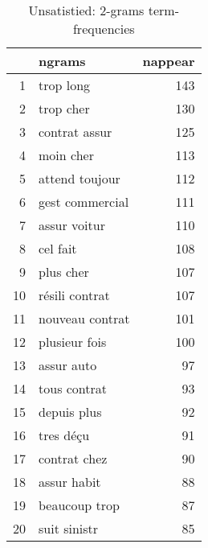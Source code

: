 \begin{table}[ht]
\centering
\begin{tabular}{rlr}
  \hline
 & ngrams & nappear \\ 
  \hline
1 & trop long & 143 \\ 
  2 & trop cher & 130 \\ 
  3 & contrat assur & 125 \\ 
  4 & moin cher & 113 \\ 
  5 & attend toujour & 112 \\ 
  6 & gest commercial & 111 \\ 
  7 & assur voitur & 110 \\ 
  8 & cel fait & 108 \\ 
  9 & plus cher & 107 \\ 
  10 & résili contrat & 107 \\ 
  11 & nouveau contrat & 101 \\ 
  12 & plusieur fois & 100 \\ 
  13 & assur auto &  97 \\ 
  14 & tous contrat &  93 \\ 
  15 & depuis plus &  92 \\ 
  16 & tres déçu &  91 \\ 
  17 & contrat chez &  90 \\ 
  18 & assur habit &  88 \\ 
  19 & beaucoup trop &  87 \\ 
  20 & suit sinistr &  85 \\ 
   \hline
\end{tabular}
\caption{Unsatistied: 2-grams term-frequencies} 
\label{tab:tf_inf_2}
\end{table}
